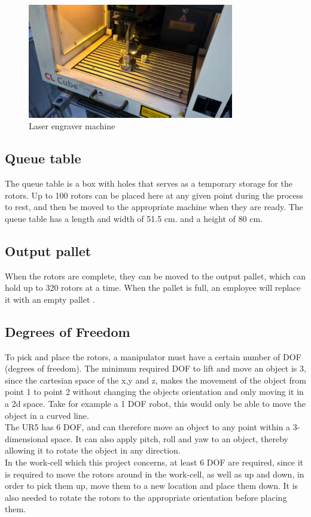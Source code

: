   \begin{figure}[h]
    \centering
    \includegraphics[width=9cm]{InitialProblemstatement/Case/engrave.PNG}
    \caption{Laser engraver machine\cite{Case}}
    \label{fig:Laserengravermachine}
  \end{figure}
  
 \subsection{Queue table}
 The queue table is a box with holes that serves as a temporary storage for the rotors. Up to 100 rotors can be placed here at any given point during the process to rest, and then be moved to the appropriate machine when they are ready. The queue table has a length and width of 51.5 cm. and a height of 80 cm\cite{Case}.\\  
 
 \subsection{Output pallet}
 When the rotors are complete, they can be moved to the output pallet, which can hold up to 320 rotors at a time. When the pallet is full, an employee will replace it with an empty pallet \cite{Case}.\\ 
 
\subsection{Degrees of Freedom}\label{DOFSec}

To pick and place the rotors, a manipulator must have a certain number of DOF (degrees of freedom). The minimum required DOF to lift and move an object is 3, since the cartesian space of the x,y and z, makes the movement of the object from point 1 to point 2 without changing the objects orientation and only moving it in a 2d space. Take for example a 1 DOF robot, this would only be able to move the object in a curved line.\\
The UR5 has 6 DOF, and can therefore move an object to any point within a 3-dimensional space. It can also apply pitch, roll and yaw to an object, thereby allowing it to rotate the object in any direction\cite{DOF}. \\ 
In the work-cell which this project concerns, at least 6 DOF are required, since it is required to move the rotors around in the work-cell, as well as up and down, in order to pick them up, move them to a new location and place them down. It is also needed to rotate the rotors to the appropriate orientation before placing them. 

